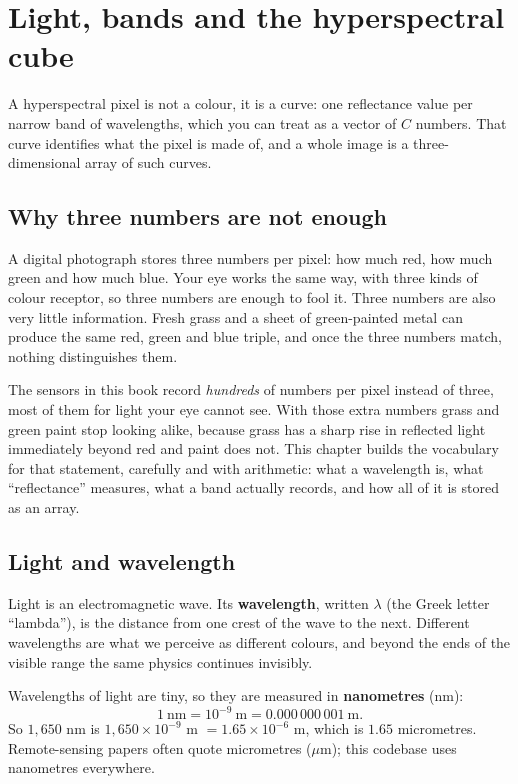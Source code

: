 \chapter{Light, bands and the hyperspectral cube}\label{ch:light}

\begin{onething}
A hyperspectral pixel is not a colour, it is a curve: one reflectance value per narrow band of
wavelengths, which you can treat as a vector of $C$ numbers. That curve identifies what the
pixel is made of, and a whole image is a three-dimensional array of such curves.
\end{onething}

\section{Why three numbers are not enough}\label{sec:light:motivation}

A digital photograph stores three numbers per pixel: how much red, how much green and how much
blue. Your eye works the same way, with three kinds of colour receptor, so three numbers are
enough to fool it. Three numbers are also very little information. Fresh grass and a sheet of
green-painted metal can produce the same red, green and blue triple, and once the three numbers
match, nothing distinguishes them.

The sensors in this book record \emph{hundreds} of numbers per pixel instead of three, most of
them for light your eye cannot see. With those extra numbers grass and green paint stop looking
alike, because grass has a sharp rise in reflected light immediately beyond red and paint does not. This
chapter builds the vocabulary for that statement, carefully and with arithmetic: what a
wavelength is, what ``reflectance'' measures, what a band actually records, and how all of it is
stored as an array.

\section{Light and wavelength}\label{sec:light:wavelength}

Light is an electromagnetic wave. Its \textbf{wavelength}, written $\lambda$
(the Greek letter ``lambda''), is the distance from one crest of the wave to the next. Different
wavelengths are what we perceive as different colours, and beyond the ends of the visible range
the same physics continues invisibly.

Wavelengths of light are tiny, so they are measured in \textbf{nanometres}
(nm):
\[ 1\ \text{nm} = 10^{-9}\ \text{m} = 0.000\,000\,001\ \text{m}. \]
So $1{,}650$ nm is $1{,}650 \times 10^{-9}$ m $= 1.65 \times 10^{-6}$ m, which is $1.65$
micrometres. Remote-sensing papers often quote micrometres ($\mu$m); this codebase uses
nanometres everywhere.

